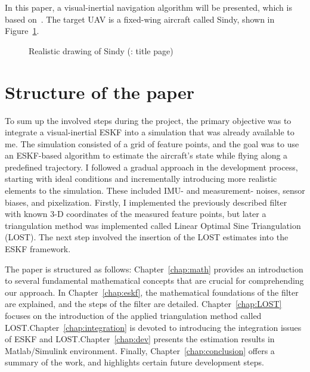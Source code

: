 In this paper, a visual-inertial navigation algorithm will be presented, which is based on~\cite{rel-nav}. The target UAV is a fixed-wing aircraft called Sindy, shown in Figure~\ref{fig:sindy}.
\begin{figure}[!ht]
    \centering
    
    \caption{Realistic drawing of Sindy (\cite{sindy-manual}: title page)}\label{fig:sindy}
\end{figure}

\section{Structure of the paper}

To sum up the involved steps during the project, the primary objective was to integrate a visual-inertial ESKF into a simulation that was already available to me. The simulation consisted of a grid of feature points, and the goal was to use an ESKF-based algorithm to estimate the aircraft's state while flying along a predefined trajectory. I followed a gradual approach in the development process, starting with ideal conditions and incrementally introducing more realistic elements to the simulation. These included IMU- and measurement- noises, sensor biases, and pixelization. Firstly, I implemented the previously described filter with known 3-D coordinates of the measured feature points, but later a triangulation method was implemented called Linear Optimal Sine Triangulation (LOST). The next step involved the insertion of the LOST estimates into the ESKF framework. 

The paper is structured as follows: Chapter~\ref{chap:math} provides an introduction to several fundamental mathematical concepts that are crucial for comprehending our approach. In Chapter~\ref{chap:eskf}, the mathematical foundations of the filter are explained, and the steps of the filter are detailed. Chapter~\ref{chap:LOST} focuses on the introduction of the applied triangulation method called LOST.\@ Chapter~\ref{chap:integration} is devoted to introducing the integration issues of ESKF and LOST.\@ Chapter~\ref{chap:dev} presents the estimation results in Matlab/Simulink environment. Finally, Chapter~\ref{chap:conclusion} offers a summary of the work, and highlights certain future development steps.
